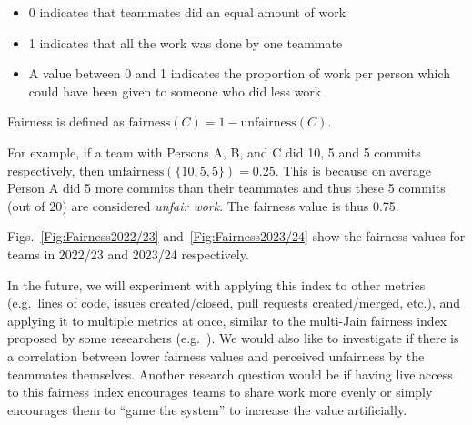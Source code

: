 \documentclass[10pt, conference]{IEEEtran}
\begin{document}
\begin{itemize}
  \item 0 indicates that teammates did an equal amount of work
  \item 1 indicates that all the work was done by one teammate
  \item A value between 0 and 1 indicates the proportion of work 
        per person which could have been given to someone who did less work
\end{itemize}

Fairness is defined as $\text{fairness}(C) = 1 - \text{unfairness}(C)$.

For example, if a team with Persons A, B, and C did 10, 5 and 5 commits respectively, then
$\text{unfairness}(\{10,5,5\}) = 0.25$. This is because on average Person A did 5 more commits than
their teammates and thus these 5 commits (out of 20) are considered \textit{unfair work}. The fairness 
value is thus 0.75.

Figs.~\ref{Fig:Fairness2022/23} and~\ref{Fig:Fairness2023/24} show the fairness values for 
teams in 2022/23 and 2023/24 respectively.

In the future, we will experiment with applying this index to other metrics (e.g.~lines of
code, issues created/closed, pull requests created/merged, etc.), and applying it to multiple metrics at once, similar to the 
multi-Jain fairness index proposed by some researchers (e.g.~\cite{koppen2013multi}).
We would also like to investigate if there is a correlation between
lower fairness values and perceived unfairness by the teammates themselves. Another
research question would be if having live access to this fairness index encourages teams to share
work more evenly or simply encourages them to ``game the system'' to increase the value artificially.
\end{document}
